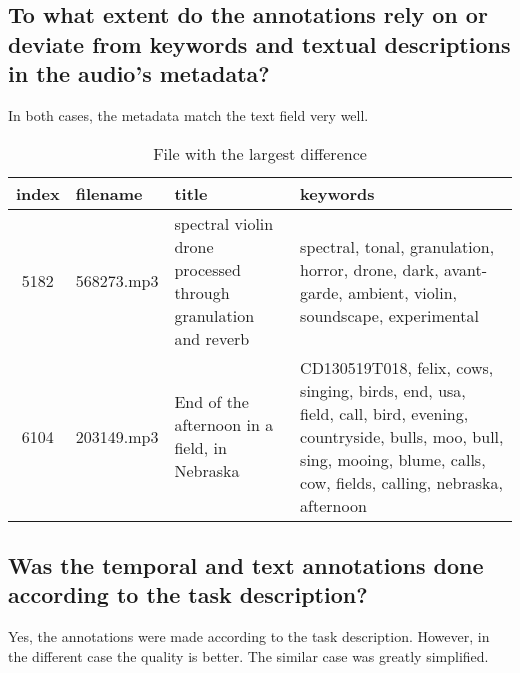 \subsection{To what extent do the annotations rely on or deviate from keywords and textual descriptions in the audio’s metadata?}
\label{sec:Case Study:b}

In both cases, the metadata match the text field very well.

\begin{table}[h]
  \caption{File with the largest difference}
  \label{tab:metadata match}
  \centering
  \begin{tabular}{clp{4cm}p{8cm}}
    \toprule
    index & filename & title & keywords \\
    \midrule
    5182 & 568273.mp3 & spectral violin drone processed through granulation and reverb & spectral, tonal, granulation, horror, drone, dark, avant-garde, ambient, violin, soundscape, experimental \\
    6104 & 203149.mp3 & End of the afternoon in a field, in Nebraska & CD130519T018, felix, cows, singing, birds, end, usa, field, call, bird, evening, countryside, bulls, moo, bull, sing, mooing, blume, calls, cow, fields, calling, nebraska, afternoon \\
    \bottomrule
  \end{tabular}
\end{table}


\subsection{Was the temporal and text annotations done according to the task description?}
\label{sec:Case Study:c}

Yes, the annotations were made according to the task description. 
However, in the different case the quality is better. 
The similar case was greatly simplified.


